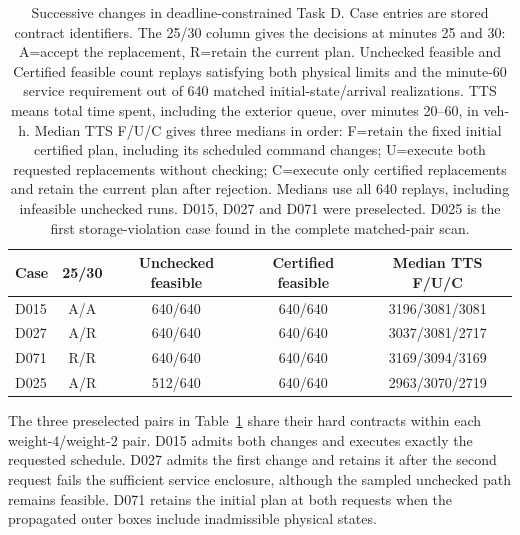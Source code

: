 \documentclass[preprint,12pt]{elsarticle}
\begin{document}
\begin{table}[t]
\centering\small
\caption{Successive changes in deadline-constrained Task D. Case entries
are stored contract identifiers. The 25/30 column gives the decisions at
minutes 25 and 30: A=accept the replacement, R=retain the current plan.
Unchecked feasible and Certified feasible count replays satisfying both
physical limits and the minute-60 service requirement out of 640 matched
initial-state/arrival realizations. TTS means total time spent, including
the exterior queue, over minutes 20--60, in veh-h.
Median TTS F/U/C gives three medians in order: F=retain the fixed initial
certified plan, including its scheduled command changes; U=execute both
requested replacements without checking; C=execute only certified
replacements and retain the current plan after rejection. Medians use all
640 replays, including infeasible unchecked runs. D015, D027 and D071 were
preselected. D025 is the first storage-violation case found in the complete
matched-pair scan.}
\label{tab:sequential-handover}
\setlength{\tabcolsep}{4pt}
\begin{tabular}{@{}lcccc@{}}
\toprule
Case & 25/30 & Unchecked feasible & Certified feasible & Median TTS F/U/C\\
\midrule
D015 & A/A & 640/640 & 640/640 & 3196/3081/3081\\
D027 & A/R & 640/640 & 640/640 & 3037/3081/2717\\
D071 & R/R & 640/640 & 640/640 & 3169/3094/3169\\
D025 & A/R & 512/640 & 640/640 & 2963/3070/2719\\
\bottomrule
\end{tabular}
\end{table}

The three preselected pairs in Table~\ref{tab:sequential-handover} share
their hard contracts within each weight-$4$/weight-$2$ pair. D015 admits
both changes and executes exactly the requested schedule. D027 admits the
first change and retains it after the second request fails the sufficient
service enclosure, although the sampled unchecked path remains feasible.
D071 retains the initial plan at both requests when the propagated outer
boxes include inadmissible physical states.
\end{document}
